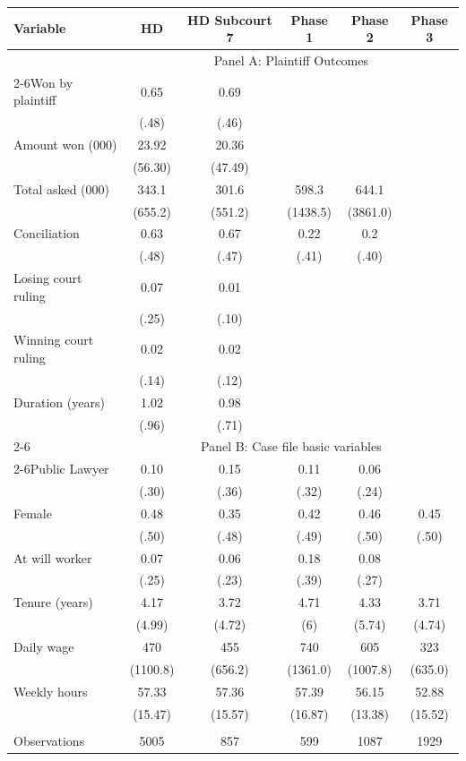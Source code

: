 \begin{tabular}{lccccc}
\toprule
Variable & HD    & HD Subcourt 7 & Phase 1 & Phase 2 & Phase 3 \\
\midrule
\midrule
      & \multicolumn{5}{c}{Panel A: Plaintiff Outcomes} \\
\cmidrule{2-6}Won by plaintiff   & 0.65  & 0.69  &       &       &  \\
      & (.48) & (.46) &       &       &  \\
Amount won (000) & 23.92 & 20.36 &       &       &  \\
      & (56.30) & (47.49) &       &       &  \\
Total asked (000) & 343.1 & 301.6 & 598.3 & 644.1 &  \\
      & (655.2) & (551.2) & (1438.5) & (3861.0) &  \\
Conciliation  & 0.63  & 0.67  & 0.22  & 0.2   &  \\
      & (.48) & (.47) & (.41) & (.40)  &  \\
Losing court ruling  & 0.07  & 0.01  &       &       &  \\
      & (.25) & (.10)  &       &       &  \\
Winning court ruling & 0.02  & 0.02  &       &       &  \\
      & (.14) & (.12) &       &       &  \\
Duration (years) & 1.02  & 0.98  &       &       &  \\
      & (.96) & (.71) &       &       &  \\
\cmidrule{2-6}      & \multicolumn{5}{c}{Panel B: Case file basic variables} \\
\cmidrule{2-6}Public Lawyer & 0.10   & 0.15  & 0.11  & 0.06  &  \\
      & (.30)  & (.36) & (.32) & (.24) &  \\
Female & 0.48  & 0.35  & 0.42  & 0.46  & 0.45 \\
      & (.50)  & (.48) & (.49) & (.50)  & (.50) \\
At will worker & 0.07  & 0.06  & 0.18  & 0.08  &  \\
      & (.25) & (.23) & (.39) & (.27) &  \\
Tenure (years) & 4.17  & 3.72  & 4.71  & 4.33  & 3.71 \\
      & (4.99) & (4.72) & (6)   & (5.74) & (4.74) \\
Daily wage & 470   & 455   & 740   & 605   & 323 \\
      & (1100.8) & (656.2) & (1361.0) & (1007.8) & (635.0) \\
Weekly hours & 57.33 & 57.36 & 57.39 & 56.15 & 52.88 \\
      & (15.47) & (15.57) & (16.87) & (13.38) & (15.52) \\
      &       &       &       &       &  \\
\midrule
Observations & 5005  & 857   & 599   & 1087  & 1929 \\
\bottomrule
\bottomrule
\end{tabular}%
